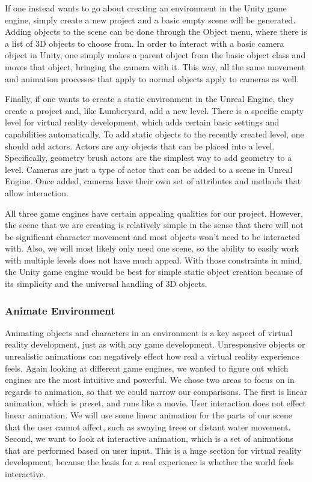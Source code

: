 \documentclass[10pt,journal,compsoc,onecolumn, draftclsnofoot]{IEEEtran}
\begin{document}
\begin{bibunit}
If one instead wants to go about creating an environment in the Unity game engine, simply create a new project and a basic empty scene will be generated.
Adding objects to the scene can be done through the Object menu, where there is a list of 3D objects to choose from. \cite{unity_getting_started}
In order to interact with a basic camera object in Unity, one simply makes a parent object from the basic object class and moves that object, bringing the camera with it.
This way, all the same movement and animation processes that apply to normal objects apply to cameras as well. \cite{unity_getting_started}

Finally, if one wants to create a static environment in the Unreal Engine, they create a project and, like Lumberyard, add a new level.
There is a specific empty level for virtual reality development, which adds certain basic settings and capabilities automatically. \cite{unreal_editor_manual}
To add static objects to the recently created level, one should add actors.  Actors are any objects that can be placed into a level.
Specifically, geometry brush actors are the simplest way to add geometry to a level. \cite{unreal_editor_manual}
Cameras are just a type of actor that can be added to a scene in Unreal Engine.  Once added, cameras have their own set of attributes and methods that allow interaction.

All three game engines have certain appealing qualities for our project.
However, the scene that we are creating is relatively simple in the sense that there will not be significant character movement and most objects won't need to be interacted with.
Also, we will most likely only need one scene, so the ability to easily work with multiple levels does not have much appeal.
With those constraints in mind, the Unity game engine would be best for simple static object creation because of its simplicity and the universal handling of 3D objects.

\subsubsection{Animate Environment}

Animating objects and characters in an environment is a key aspect of virtual reality development, just as with any game development.
Unresponsive objects or unrealistic animations can negatively effect how real a virtual reality experience feels.
Again looking at different game engines, we wanted to figure out which engines are the most intuitive and powerful.
We chose two areas to focus on in regards to animation, so that we could narrow our comparisons.
The first is linear animation, which is preset, and runs like a movie. User interaction does not effect linear animation.
We will use some linear animation for the parts of our scene that the user cannot affect, such as swaying trees or distant water movement.
Second, we want to look at interactive animation, which is a set of animations that are performed based on user input.
This is a huge section for virtual reality development, because the basis for a real experience is whether the world feels interactive.


\end{bibunit}
\end{document}
